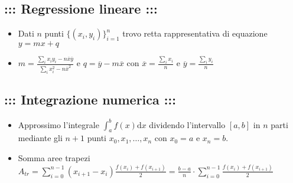 \documentclass[a4paper,12pt]{amsart}
\begin{document}
\subsection*{\bf ::: Regressione lineare :::} 
\begin{itemize}
\item Dati $n$ punti $\{(x_i,y_i)\}_{i=1}^{n}$ trovo retta rappresentativa di equazione $y=mx+q$
\item $m=\frac{\sum_i x_i y_i - n \overline{x} \overline{y}}{\sum_i x_i^2 - n \overline{x}^2}$ e $q = \overline{y} - m \overline{x}$ con $\overline{x} = \frac{\sum_i x_i}{n}$ e $\overline{y}=\frac{\sum_i y_i}{n}$
\end{itemize}


\subsection*{\bf ::: Integrazione numerica :::} 
\begin{itemize}
\item Approssimo l'integrale $\int_{a}^b f(x) \mathrm{d}x$ dividendo l'intervallo $[a,b]$ in $n$ parti mediante gli $n+1$ punti $x_0,x_1,\ldots,x_n$ con $x_0=a$ e $x_n=b$.
\item Somma aree trapezi $A_{tr}=\sum_{i=0}^{n-1} (x_{i+1}-x_i) \frac{f(x_i)+f(x_{i+1})}{2}=\frac{b-a}{n} \cdot \sum_{i=0}^{n-1} \frac{f(x_i)+f(x_{i+1})}{2}$
\end{itemize}
\end{document}
